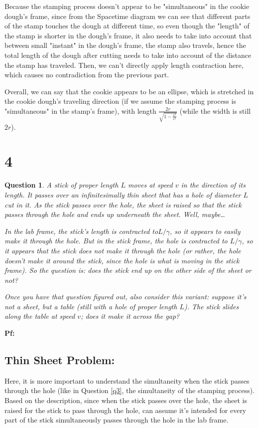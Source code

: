 \documentclass{article}
\newtheorem{question}{Question}
\begin{document}
Because the stamping process doesn't appear to be "simultaneous" in the cookie dough's frame, since from the Spacetime diagram we can see that different parts of the stamp touches the dough at different time, so even though the "length" of the stamp is shorter in the dough's frame, it also needs to take into account that between small "instant" in the dough's frame, the stamp also travels, hence the total length of the dough after cutting needs to take into account of the distance the stamp has traveled. Then, we can't directly apply length contraction here, which causes no contradiction from the previous part.

\hfil

Overall, we can say that the cookie appears to be an ellipse, which is stretched in the cookie dough's traveling direction (if we assume the stamping process is "simultaneous" in the stamp's frame), with length $\frac{2r}{\sqrt{1-\frac{v^2}{c^2}}}$ (while the width is still $2r$).

\break

\section*{4}
\begin{question}\label{q4}
    A stick of proper length $L$ moves at speed $v$ in the direction of its length. It passes over an infinitesimally thin sheet that has a hole of diameter $L$ cut in it. As the stick passes over the hole, the sheet is raised so that the stick passes through the hole and ends up underneath the sheet. Well, maybe\dots

    In the lab frame, the stick's length is contracted to$L/\gamma$, so it appears to easily make it through the hole. But in the stick frame, the \emph{hole} is contracted to $L/\gamma$, so it appears that the stick does \emph{not} make it through the hole (or rather, the hole doesn't make it around the stick, since the hole is what is moving in the stick frame). So the question is: does the stick end up on the other side of the sheet or not?

    Once you have that question figured out, also consider this variant: suppose it's not a sheet, but a table (still with a hole of proper length $L$). The stick slides along the table at speed $v$; does it make it across the gap?
\end{question}

\textbf{Pf:}

\subsection*{Thin Sheet Problem:}
Here, it is more important to understand the simultaneity when the stick passes through the hole (like in Question \ref{q3}, the simultaneity of the stamping process). Based on the description, since when the stick passes over the hole, the sheet is raised for the stick to pass through the hole, can assume it's intended for every part of the stick simultaneously passes through the hole in the lab frame.
\end{document}
